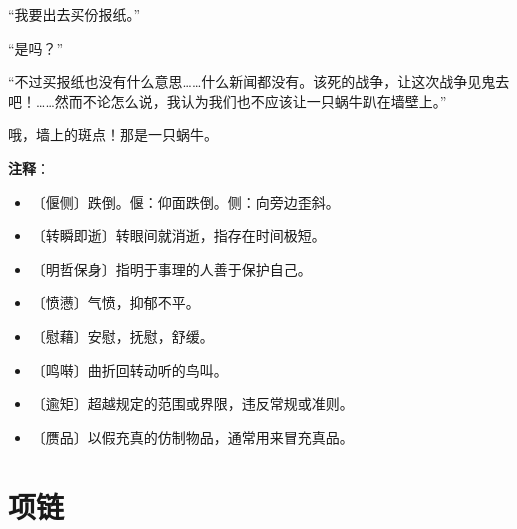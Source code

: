 \documentclass[12pt,UTF-8,openany]{ctexbook}
\begin{document}
\begin{large}
    “我要出去买份报纸。”
    
    “是吗？”
    
    “不过买报纸也没有什么意思……什么新闻都没有。该死的战争，让这次战争见鬼去吧！……然而不论怎么说，我认为我们也不应该让一只蜗牛趴在墙壁上。”
    
    哦，墙上的斑点！那是一只蜗牛。
    
\end{large}


\newpage

\textbf{注释}：

\vspace{-1em}

\begin{itemize}
    \setlength\itemsep{-0.2em}
    \item 〔偃侧〕跌倒。偃：仰面跌倒。侧：向旁边歪斜。
    \item 〔转瞬即逝〕转眼间就消逝，指存在时间极短。
    \item 〔明哲保身〕指明于事理的人善于保护自己。
    \item 〔愤懑〕气愤，抑郁不平。
    \item 〔慰藉〕安慰，抚慰，舒缓。
    \item 〔鸣啭〕曲折回转动听的鸟叫。
    \item 〔逾矩〕超越规定的范围或界限，违反常规或准则。
    \item 〔赝品〕以假充真的仿制物品，通常用来冒充真品。
\end{itemize}

\chapter{项链}
\end{document}
